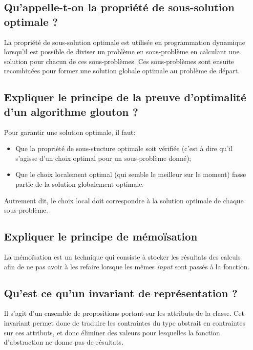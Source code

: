 \documentclass[11pt]{article}
\begin{document}
\subsection{Qu'appelle-t-on la propriété de sous-solution optimale ?}

La propriété de sous-solution optimale est utilisée en programmation dynamique lorsqu'il est possible de diviser un problème en sous-problème en calculant une solution pour chacun de ces sous-problèmes. Ces sous-problèmes sont ensuite recombinées pour former une solution globale optimale au problème de départ.

\subsection{Expliquer le principe de la preuve d'optimalité d'un algorithme glouton ?}

Pour garantir une solution optimale, il faut:

\begin{itemize}
	\item Que la propriété de sous-stucture optimale soit vérifiée (c'est à dire qu'il s'agisse d'un choix optimal pour un sous-problème donné);
	\item Que le choix localement optimal (qui semble le meilleur sur le moment) fasse partie de la solution globalement optimale.
\end{itemize}

Autrement dit, le choix local doit correspondre à la solution optimale de chaque sous-problème.

\subsection{Expliquer le principe de mémoïsation}

La mémoïsation est un technique qui consiste à stocker les résultats des calculs afin de ne pas avoir à les refaire lorsque les mêmes \emph{input} sont passés à la fonction.

\subsection{Qu'est ce qu'un invariant de représentation ?}

Il s'agit d'un ensemble de propositions portant sur les attributs de la classe. Cet invariant permet donc de traduire les contraintes du type abstrait en contraintes sur ces attributs, et donc éliminer des valeurs pour lesquelles la fonction d’abstraction ne donne pas de résultats.
\end{document}
